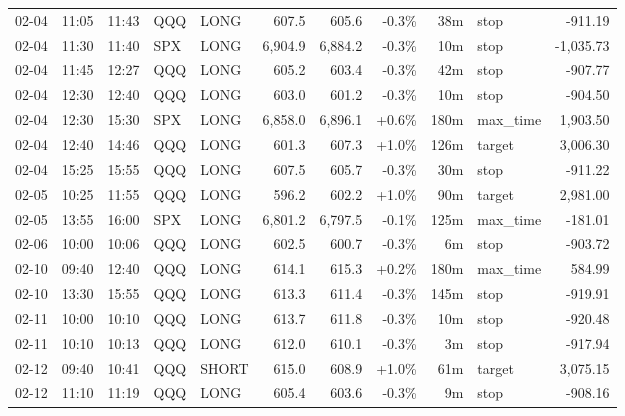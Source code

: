 \documentclass[11pt,a4paper,twoside]{article}
\begin{document}
\begin{center}
\begin{longtable}{>{\color{txtmain}}l l l l l r r r r >{\color{txtmain}}l r}
02-04 & 11:05 & 11:43 & QQQ & LONG & 607.5 & 605.6 & \textcolor{lossred}{-0.3\%} & 38m & stop & \textcolor{lossred}{-911.19} \\
02-04 & 11:30 & 11:40 & SPX & LONG & 6,904.9 & 6,884.2 & \textcolor{lossred}{-0.3\%} & 10m & stop & \textcolor{lossred}{-1,035.73} \\
02-04 & 11:45 & 12:27 & QQQ & LONG & 605.2 & 603.4 & \textcolor{lossred}{-0.3\%} & 42m & stop & \textcolor{lossred}{-907.77} \\
02-04 & 12:30 & 12:40 & QQQ & LONG & 603.0 & 601.2 & \textcolor{lossred}{-0.3\%} & 10m & stop & \textcolor{lossred}{-904.50} \\
02-04 & 12:30 & 15:30 & SPX & LONG & 6,858.0 & 6,896.1 & \textcolor{wingreen}{+0.6\%} & 180m & max\_time & \textcolor{wingreen}{1,903.50} \\
02-04 & 12:40 & 14:46 & QQQ & LONG & 601.3 & 607.3 & \textcolor{wingreen}{+1.0\%} & 126m & target & \textcolor{wingreen}{3,006.30} \\
02-04 & 15:25 & 15:55 & QQQ & LONG & 607.5 & 605.7 & \textcolor{lossred}{-0.3\%} & 30m & stop & \textcolor{lossred}{-911.22} \\
02-05 & 10:25 & 11:55 & QQQ & LONG & 596.2 & 602.2 & \textcolor{wingreen}{+1.0\%} & 90m & target & \textcolor{wingreen}{2,981.00} \\
02-05 & 13:55 & 16:00 & SPX & LONG & 6,801.2 & 6,797.5 & \textcolor{lossred}{-0.1\%} & 125m & max\_time & \textcolor{lossred}{-181.01} \\
02-06 & 10:00 & 10:06 & QQQ & LONG & 602.5 & 600.7 & \textcolor{lossred}{-0.3\%} & 6m & stop & \textcolor{lossred}{-903.72} \\
02-10 & 09:40 & 12:40 & QQQ & LONG & 614.1 & 615.3 & \textcolor{wingreen}{+0.2\%} & 180m & max\_time & \textcolor{wingreen}{584.99} \\
02-10 & 13:30 & 15:55 & QQQ & LONG & 613.3 & 611.4 & \textcolor{lossred}{-0.3\%} & 145m & stop & \textcolor{lossred}{-919.91} \\
02-11 & 10:00 & 10:10 & QQQ & LONG & 613.7 & 611.8 & \textcolor{lossred}{-0.3\%} & 10m & stop & \textcolor{lossred}{-920.48} \\
02-11 & 10:10 & 10:13 & QQQ & LONG & 612.0 & 610.1 & \textcolor{lossred}{-0.3\%} & 3m & stop & \textcolor{lossred}{-917.94} \\
02-12 & 09:40 & 10:41 & QQQ & SHORT & 615.0 & 608.9 & \textcolor{wingreen}{+1.0\%} & 61m & target & \textcolor{wingreen}{3,075.15} \\
02-12 & 11:10 & 11:19 & QQQ & LONG & 605.4 & 603.6 & \textcolor{lossred}{-0.3\%} & 9m & stop & \textcolor{lossred}{-908.16} \\

\end{longtable}
\end{center}
\end{document}
